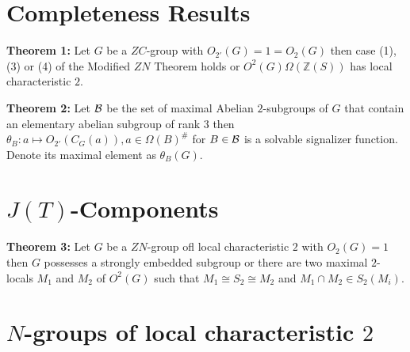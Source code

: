 \section{Completeness Results}
{\bf Theorem 1:}  Let $G$ be a $ZC$-group with $O_{2'}(G)=1=O_2(G)$ then case (1), (3) or (4)
of the Modified $ZN$ Theorem holds or $O^2(G) \Omega({\mathbb Z}(S))$ has local characteristic $2$.
\begin{quote}
\end{quote}
{\bf Theorem 2:} Let ${\cal B}$ be the set of maximal Abelian $2$-subgroups of $G$ that contain
an elementary abelian subgroup of rank $3$ then 
$\theta_B: a \mapsto O_{2'}(C_G(a)), a \in \Omega(B)^{\#}$ for $B \in {\cal B}$ is a solvable
signalizer function.  Denote its maximal element as $\theta_B(G)$.
\begin{quote}
\end{quote}
\section{$J(T)$-Components}
{\bf Theorem 3:}  Let $G$ be a $ZN$-group ofl local characteristic $2$ with $O_2(G)=1$ then
$G$ possesses a strongly embedded subgroup or there are two maximal $2$-locals $M_1$ and $M_2$
of $O^2(G)$ such that $M_1 \cong S_2 \cong M_2$ and $M_1 \cap M_2 \in S_2(M_i)$.
\begin{quote}
\end{quote}
\section{$N$-groups of local characteristic $2$}


